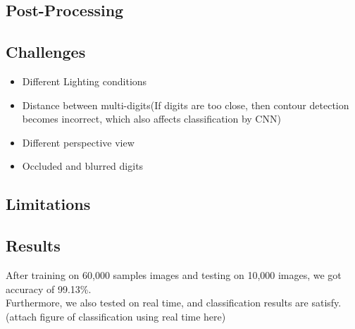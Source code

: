 \documentclass[12pt, letterpaper]{article}
\begin{document}
\subsection{Post-Processing}


\subsection{Challenges}

	\begin{itemize}
		\item Different Lighting conditions
		\item Distance between multi-digits(If digits are too close, then contour detection becomes incorrect, which also affects classification by CNN)
		\item Different perspective view
		\item Occluded and blurred digits
	\end{itemize}

\subsection{Limitations}

\subsection{Results}

After training on 60,000 samples images and testing on 10,000 images, we got accuracy of 99.13\%. \\
Furthermore, we also tested on real time, and classification results are satisfy.
(attach figure of classification using real time here)

\end{document}
